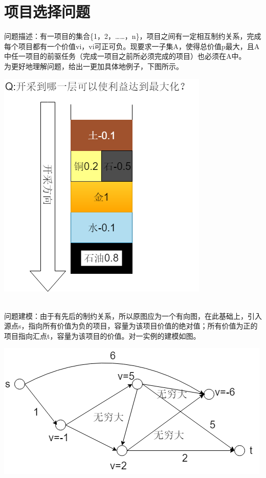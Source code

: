 \section{项目选择问题}
问题描述：有一项目的集合\{1，2，……，n\}，项目之间有一定相互制约关系，完成每个项目都有一个价值vi，vi可正可负。现要求一子集A，使得总价值p最大，且A中任一项目的前驱任务（完成一项目之前所必须完成的项目）也必须在A中。
\\为更好地理解问题，给出一更加具体地例子，下图所示。\\
\centerline{\includegraphics[scale=0.6]{image/networkflow8.png}}
\\问题建模：由于有先后的制约关系，所以原图应为一个有向图，在此基础上，引入源点s，指向所有价值为负的项目，容量为该项目价值的绝对值；所有价值为正的项目指向汇点t，容量为该项目的价值。对一实例的建模如图。\\
\centerline{\includegraphics[scale=0.6]{image/networkflow9.png}}

